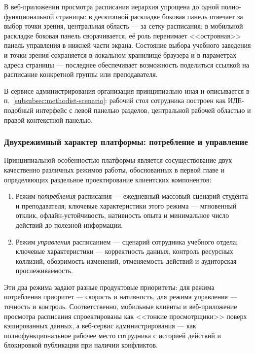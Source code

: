 В веб-приложении просмотра расписания иерархия упрощена до одной полно-функциональной страницы: в десктопной раскладке боковая панель отвечает за выбор точки зрения, центральная область --- за сетку расписания; в мобильной раскладке боковая панель сворачивается, её роль перенимает <<островная>> панель управления в нижней части экрана. Состояние выбора учебного заведения и точки зрения сохраняется в локальном хранилище браузера и в параметрах адреса страницы --- последнее обеспечивает возможность поделиться ссылкой на расписание конкретной группы или преподавателя.

В сервисе администрирования организация принципиально иная и описывается в п.~\ref{subsubsec:methodist-scenario}: рабочий стол сотрудника построен как ИДЕ-подобный интерфейс с левой панелью разделов, центральной рабочей областью и правой контекстной панелью.

\subsubsection{Двухрежимный характер платформы: потребление и управление}
\label{subsubsec:two-modes}

Принципиальной особенностью платформы является сосуществование двух качественно различных режимов работы, обоснованных в первой главе и определяющих раздельное проектирование клиентских компонентов:

\begin{enumerate}
  \item Режим \emph{потребления} расписания --- ежедневный массовый сценарий студента и преподавателя; ключевые характеристики этого режима --- мгновенный отклик, офлайн-устойчивость, нативность опыта и минимальное число действий до полезной информации.
  \item Режим \emph{управления} расписанием --- сценарий сотрудника учебного отдела; ключевые характеристики --- корректность данных, контроль ресурсных коллизий, обозримость изменений, отменяемость действий и аудиторская прослеживаемость.
\end{enumerate}

Эти два режима задают разные продуктовые приоритеты: для режима потребления приоритет --- скорость и нативность, для режима управления --- точность и контроль. Соответственно, мобильные клиенты и веб-приложение просмотра расписания спроектированы как <<тонкие просмотрщики>> поверх кэшированных данных, а веб-сервис администрирования --- как полнофункциональное рабочее место сотрудника с историей действий и блокировкой публикации при наличии конфликтов.

